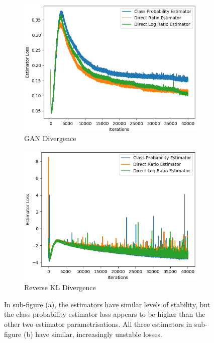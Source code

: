 \documentclass[honours,12pt]{unswthesis}
\numberwithin{equation}{section}
\theoremstyle{definition}
\begin{document}
\newpage
\begin{figure}
\begin{subfigure}{0.49\textwidth}
\includegraphics[width=\linewidth]{estimator_losses/JCADVvsJCADVexpvsJCADVgudlog.png}
\caption{GAN Divergence}
\end{subfigure}
\begin{subfigure}{0.49\textwidth}
\includegraphics[width=\linewidth]{estimator_losses/JCKLDvsJCKLexpvsJCKLgudlog.png}
\caption{Reverse KL Divergence}
\end{subfigure}
\caption{\small In sub-figure (a), the estimators have similar levels of stability, but the class probability estimator loss appears to be higher than the other two estimator parametrisations. All three estimators in sub-figure (b) have similar, increasingly unstable losses.}
\label{fig:6.5}
\end{figure}
\end{document}
